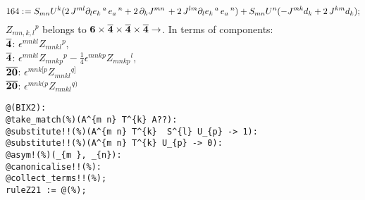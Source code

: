 \documentclass[11pt]{article}
\def\specialcolon{\mathrel{\mathop{:}}\hspace{-.5em}}
\renewcommand{\bar}[1]{\overline{#1}}
\begin{document}
\begin{dmath*}[compact, spread=2pt]
164\specialcolon{}= {S}_{m n} {U}^{k} (2\, {J}^{m l} {\partial}_{l}{{e}_{k}\,^{a}}\,  {e}_{a}\,^{n} + 2\, {\partial}_{k}{{J}^{m n}}\,  + 2\, {J}^{l m} {\partial}_{l}{{e}_{k}\,^{a}}\,  {e}_{a}\,^{n}) + {S}_{m n} {U}^{n} ( - {J}^{m k} {d}_{k} + 2\, {J}^{k m} {d}_{k});
\end{dmath*}
$Z_{mn,k,l}{}^p$ belongs to $\bf 6 \times \bar{4} \times \bar{4} \times \bar{4}  \to$. 
In terms of components:\\
$\bf \bar{4}$: $\epsilon^{mnkl}Z_{mnkl}{}^p$,\\
$\bf \bar{4}$: $\epsilon^{mnkl}Z_{mnkp}{}^p - \frac{1}{4}\epsilon^{mnkp}Z_{mnkp}{}^l$,\\
${\bf \bar {20}} $: $\epsilon^{mnk[p}Z_{mnkl}{}^{q]}$\\
${\bf \bar {20}} $: $\epsilon^{mnk(p}Z_{mnkl}{}^{q)}$
{\color[named]{Blue}\begin{verbatim}
@(BIX2):
@take_match(%)(A^{m n} T^{k} A??):
@substitute!!(%)(A^{m n} T^{k}  S^{l} U_{p} -> 1):
@substitute!!(%)(A^{m n} T^{k} U_{p} -> 0):
@asym!(%)(_{m }, _{n}):
@canonicalise!!(%):
@collect_terms!!(%);
ruleZ21 := @(%);
\end{verbatim}}
\end{document}

